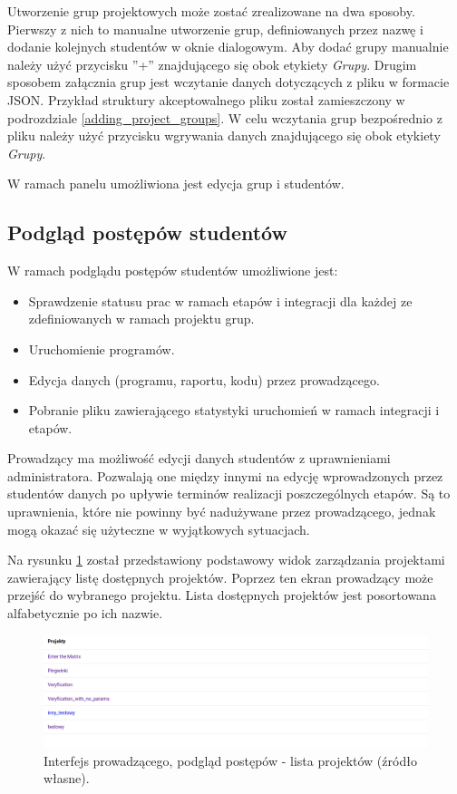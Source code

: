 Utworzenie grup projektowych może zostać zrealizowane na dwa sposoby.
Pierwszy z nich to manualne utworzenie grup, definiowanych przez nazwę i dodanie kolejnych studentów w oknie dialogowym.
Aby dodać grupy manualnie należy użyć przycisku ”+” znajdującego się obok etykiety \textit{Grupy}.
Drugim sposobem załącznia grup jest wczytanie danych dotyczących z pliku w formacie JSON.
Przykład struktury akceptowalnego pliku został zamieszczony w podrozdziale \ref{adding_project_groups}.
W celu wczytania grup bezpośrednio z pliku należy użyć przycisku wgrywania danych znajdującego się obok etykiety \textit{Grupy}.

W ramach panelu umożliwiona jest edycja grup i studentów.

\subsection{Podgląd postępów studentów}
\label{lecturer_preview}

W ramach podglądu postępów studentów umożliwione jest:
\begin {itemize}
    \item Sprawdzenie statusu prac w ramach etapów i integracji dla każdej ze zdefiniowanych w ramach projektu grup.
    \item Uruchomienie programów.
    \item Edycja danych (programu, raportu, kodu) przez prowadzącego.
    \item Pobranie pliku zawierającego statystyki uruchomień w ramach integracji i etapów.
\end {itemize}

Prowadzący ma możliwość edycji danych studentów z uprawnieniami administratora.
Pozwalają one między innymi na edycję wprowadzonych przez studentów danych po upływie terminów realizacji poszczególnych etapów.
Są to uprawnienia, które nie powinny być nadużywane przez prowadzącego, jednak mogą okazać się użyteczne w wyjątkowych sytuacjach.

Na rysunku \ref{fig:lecturer_preview_projects_list} został przedstawiony podstawowy widok zarządzania projektami zawierający listę dostępnych projektów.
Poprzez ten ekran prowadzący może przejść do wybranego projektu.
Lista dostępnych projektów jest posortowana alfabetycznie po ich nazwie.

\begin{figure}[h]
    \centering
    \includegraphics[width = 13cm]{chapter04/lecturer_preview_projects_list.png}
    \caption{Interfejs prowadzącego, podgląd postępów - lista projektów (źródło własne).}
    \label{fig:lecturer_preview_projects_list}
\end{figure}

